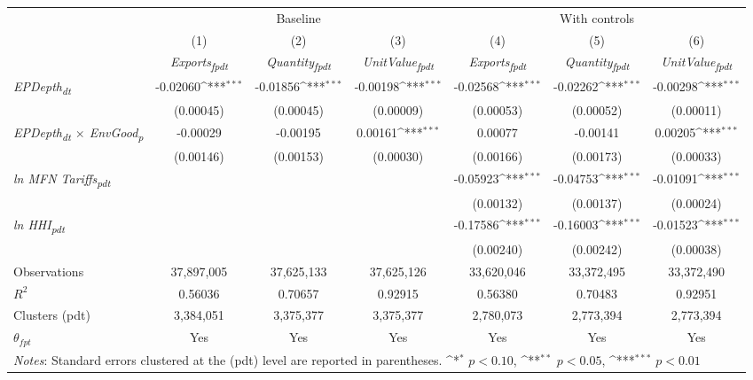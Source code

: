 {
\def\sym#1{\ifmmode^{#1}\else\(^{#1}\)\fi}
\begin{tabular}{l*{6}{c}}
\toprule
&\multicolumn{3}{c}{Baseline}&\multicolumn{3}{c}{With controls}\\\cmidrule(lr){2-4}\cmidrule(lr){5-7}
&(1)&(2)&(3)&(4)&(5)&(6)\\
&\textit{Exports\textsubscript{fpdt}}&\textit{Quantity\textsubscript{fpdt}}&\textit{UnitValue\textsubscript{fpdt}}&\textit{Exports\textsubscript{fpdt}}&\textit{Quantity\textsubscript{fpdt}}&\textit{UnitValue\textsubscript{fpdt}}\\
\midrule
\textit{EPDepth\textsubscript{dt}} & -0.02060\sym{***} & -0.01856\sym{***} & -0.00198\sym{***} & -0.02568\sym{***} & -0.02262\sym{***} & -0.00298\sym{***}\\
 & (0.00045) & (0.00045) & (0.00009) & (0.00053) & (0.00052) & (0.00011)\\
\addlinespace
\textit{EPDepth\textsubscript{dt} $\times$ EnvGood\textsubscript{p}} & -0.00029 & -0.00195 & 0.00161\sym{***} & 0.00077 & -0.00141 & 0.00205\sym{***}\\
 & (0.00146) & (0.00153) & (0.00030) & (0.00166) & (0.00173) & (0.00033)\\
\addlinespace
\textit{ln MFN Tariffs\textsubscript{pdt}} &  &  &  & -0.05923\sym{***} & -0.04753\sym{***} & -0.01091\sym{***}\\
 &  &  &  & (0.00132) & (0.00137) & (0.00024)\\
\addlinespace
\textit{ln HHI\textsubscript{pdt}} &  &  &  & -0.17586\sym{***} & -0.16003\sym{***} & -0.01523\sym{***}\\
 &  &  &  & (0.00240) & (0.00242) & (0.00038)\\
\midrule
Observations & 37,897,005 & 37,625,133 & 37,625,126 & 33,620,046 & 33,372,495 & 33,372,490\\
$R^{2}$ & 0.56036 & 0.70657 & 0.92915 & 0.56380 & 0.70483 & 0.92951\\
Clusters (pdt) & 3,384,051 & 3,375,377 & 3,375,377 & 2,780,073 & 2,773,394 & 2,773,394\\
$\theta_{fpt}$ & Yes & Yes & Yes & Yes & Yes & Yes\\
\bottomrule
\multicolumn{7}{l}{\footnotesize \textit{Notes}: Standard errors clustered at the (pdt) level are reported in parentheses. \sym{*} \(p<0.10\), \sym{**} \(p<0.05\), \sym{***} \(p<0.01\)}\\
\end{tabular}
}
